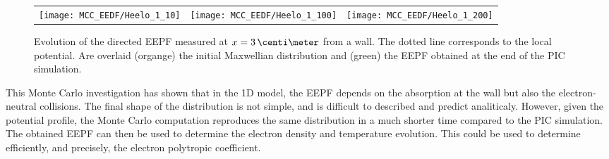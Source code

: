     \begin{figure}[hbtp]
      \begin{tabular}{ccc}
        \texttt{[image: MCC\_EEDF/Heelo\_1\_10]} &
        \texttt{[image: MCC\_EEDF/Heelo\_1\_100]} &
        \texttt{[image: MCC\_EEDF/Heelo\_1\_200]} \\
      \end{tabular}
      \caption{Evolution of the directed EEPF measured at $x=3\,\centi\meter$ from a wall. The dotted line corresponds to the local potential. Are overlaid (organge) the initial Maxwellian distribution and (green) the EEPF obtained at the end of the \ac{PIC} simulation. }
      \label{fig-zoom_Mc_later}
    \end{figure}

    \vspace{1em}
    This Monte Carlo investigation has shown that in the \ac{1D} model, the EEPF depends on the absorption at the wall but also the electron-neutral collisions.
    The final shape of the distribution is not simple, and is difficult to described and predict analiticaly.
    However, given the potential profile, the Monte Carlo computation reproduces the same distribution in a much shorter time compared to the \ac{PIC} simulation. 
    The obtained EEPF can then be used to determine the electron density and temperature evolution.
    This could be used to determine efficiently, and precisely, the electron polytropic coefficient.